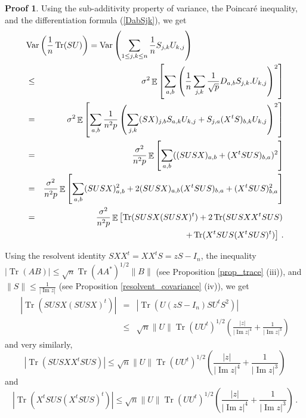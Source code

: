 \documentclass[11pt,a4paper]{article}
\DeclareMathOperator{\E}{\mathbb{E}}
\DeclareMathOperator{\1}{\mathbf{1}}
\DeclareMathOperator{\Imag}{\mathrm{Im}}
\DeclareMathOperator{\Var}{\mathrm{Var}}
\DeclareMathOperator{\Tr}{\mathrm{Tr}}
\theoremstyle{definition}
\newtheorem*{Proof}{Proof}
\begin{document}
\begin{Proof}
Using the sub-additivity property of variance, the Poincar\'e inequality, and the differentiation formula (\ref{DabSjk}), we get
\begin{eqnarray} \label{conc1_eq1}
\lefteqn{   \Var \left( \frac1n \Tr(SU) \right) = \Var \left( \sum_{1 \le j,k \le n} \frac1n S_{j,k}U_{k,j} \right)   } \nonumber \\
& \le & \sigma^2 \E \left[ \sum_{a,b} \left( \frac1n \sum_{j,k} \frac{1}{\sqrt{p}} D_{a,b}S_{j,k}.U_{k,j} \right)^2 \right] \nonumber \\
& = & \sigma^2 \E \left[ \sum_{a,b} \frac{1}{n^2p} \left( \sum_{j,k} (SX)_{j,b}S_{a,k}U_{k,j} + S_{j,a}(X^tS)_{b,k}U_{k,j} \right)^2 \right] \nonumber \\
& = & \frac{\sigma^2}{n^2p} \E \left[ \sum_{a,b} ((SUSX)_{a,b} + (X^tSUS)_{b,a})^2 \right] \nonumber \\
& = & \frac{\sigma^2}{n^2p} \E \left[ \sum_{a,b} (SUSX)_{a,b}^2 + 2(SUSX)_{a,b}(X^tSUS)_{b,a} + (X^tSUS)_{b,a}^2 \right] \nonumber \\
& = & \frac{\sigma^2}{n^2p} \E \left[ \Tr(SUSX(SUSX)^t) + 2 \Tr(SUSXX^tSUS) \right. \nonumber \\
& & \quad \left. + \Tr(X^tSUS(X^tSUS)^t) \right] \, .
\end{eqnarray}

Using the resolvent identity $SXX^t=XX^tS=zS-I_n$, the inequality $|\Tr(AB)| \le \sqrt{n} \Tr(AA^*)^{1/2} \|B\|$ (see Proposition \ref{prop_trace} (iii)), and $\|S\| \le \frac{1}{|\Imag z|}$ (see Proposition \ref{resolvent_covariance} (iv)), we get
\begin{eqnarray} \label{conc1_eq2}
\left| \Tr(SUSX(SUSX)^t) \right| & = & \left| \Tr(U(zS-I_n)SU^tS^2) \right| \nonumber \\
& \le & \sqrt{n} \|U\| \Tr(UU^t)^{1/2} \left( \frac{|z|}{|\Imag z|^4} + \frac{1}{|\Imag z|^3} \right)
\end{eqnarray}
and very similarly,
\begin{equation} \label{conc1_eq3}
\left| \Tr(SUSXX^tSUS) \right| \le \sqrt{n} \|U\| \Tr(UU^t)^{1/2} \left( \frac{|z|}{|\Imag z|^4} + \frac{1}{|\Imag z|^3} \right)
\end{equation}
and
\begin{equation} \label{conc1_eq4}
\left| \Tr(X^tSUS(X^tSUS)^t) \right| \le \sqrt{n} \|U\| \Tr(UU^t)^{1/2} \left( \frac{|z|}{|\Imag z|^4} + \frac{1}{|\Imag z|^3} \right) \, .
\end{equation}


\end{Proof}
\end{document}
